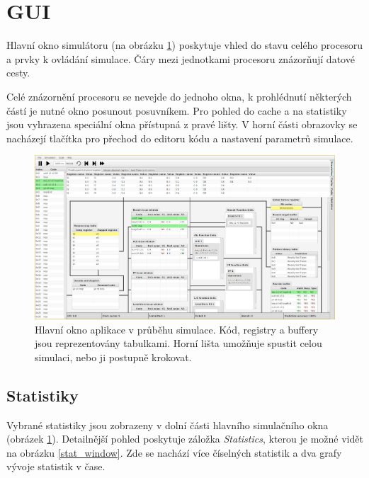 \section{GUI}

Hlavní okno simulátoru (na obrázku \ref{old_gui}) poskytuje vhled do stavu celého procesoru a prvky k ovládání simulace.
Čáry mezi jednotkami procesoru znázorňují datové cesty.

Celé znázornění procesoru se nevejde do jednoho okna, k prohlédnutí některých částí je nutné okno posunout posuvníkem.
Pro pohled do cache a na statistiky jsou vyhrazena speciální okna přístupná z pravé lišty.
V horní části obrazovky se nacházejí tlačítka pro přechod do editoru kódu a nastavení parametrů simulace.

\begin{figure}[hbtp]
    \includegraphics[width=\textwidth]{obrazky-figures/simulating.png}
    \caption{Hlavní okno aplikace v průběhu simulace. Kód, registry a buffery jsou reprezentovány tabulkami. Horní lišta umožňuje spustit celou simulaci, nebo ji postupně krokovat.}
    \label{old_gui}
\end{figure}

\subsection{Statistiky}

Vybrané statistiky jsou zobrazeny v dolní části hlavního simulačního okna (obrázek \ref{old_gui}).
Detailnější pohled poskytuje záložka \emph{Statistics}, kterou je možné vidět na obrázku \ref{stat_window}.
Zde se nachází více číselných statistik a dva grafy vývoje statistik v čase.

